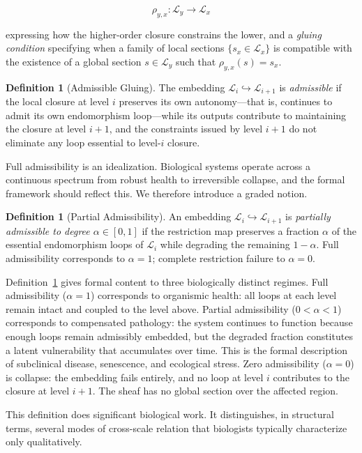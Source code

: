 \documentclass[11pt, a4paper]{article}
\theoremstyle{plain}
\theoremstyle{definition}
\newtheorem{definition}[theorem]{Definition}
\theoremstyle{remark}
\newcommand{\CL}{\mathcal{L}}
\begin{document}
\[
\rho_{y,x} : \CL_y \longrightarrow \CL_x
\]

expressing how the higher-order closure constrains the lower, and a \emph{gluing condition} specifying when a family of local sections $\{s_x \in \CL_x\}$ is compatible with the existence of a global section $s \in \CL_y$ such that $\rho_{y,x}(s) = s_x$.

\begin{definition}[Admissible Gluing]
The embedding $\CL_i \hookrightarrow \CL_{i+1}$ is \emph{admissible} if the local closure at level $i$ preserves its own autonomy---that is, continues to admit its own endomorphism loop---while its outputs contribute to maintaining the closure at level $i+1$, and the constraints issued by level $i+1$ do not eliminate any loop essential to level-$i$ closure.
\end{definition}

Full admissibility is an idealization. Biological systems operate across a continuous spectrum from robust health to irreversible collapse, and the formal framework should reflect this. We therefore introduce a graded notion.

\begin{definition}[Partial Admissibility]
\label{def:partialadmissible}
An embedding $\CL_i \hookrightarrow \CL_{i+1}$ is \emph{partially admissible to degree $\alpha \in [0,1]$} if the restriction map preserves a fraction $\alpha$ of the essential endomorphism loops of $\CL_i$ while degrading the remaining $1 - \alpha$. Full admissibility corresponds to $\alpha = 1$; complete restriction failure to $\alpha = 0$.
\end{definition}

Definition~\ref{def:partialadmissible} gives formal content to three biologically distinct regimes. Full admissibility ($\alpha = 1$) corresponds to organismic health: all loops at each level remain intact and coupled to the level above. Partial admissibility ($0 < \alpha < 1$) corresponds to compensated pathology: the system continues to function because enough loops remain admissibly embedded, but the degraded fraction constitutes a latent vulnerability that accumulates over time. This is the formal description of subclinical disease, senescence, and ecological stress. Zero admissibility ($\alpha = 0$) is collapse: the embedding fails entirely, and no loop at level $i$ contributes to the closure at level $i+1$. The sheaf has no global section over the affected region.

This definition does significant biological work. It distinguishes, in structural terms, several modes of cross-scale relation that biologists typically characterize only qualitatively.
\end{document}
